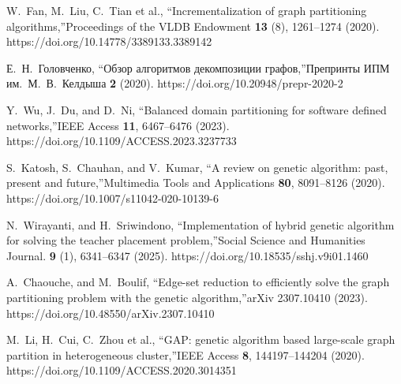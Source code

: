 \documentclass[
11pt,%
tightenlines,%
twoside,%
onecolumn,%
nofloats,%
nobibnotes,%
nofootinbib,%
superscriptaddress,%
noshowpacs,%
centertags]%
{revtex4}
\begin{document}
\begin{thebibliography}{99}
W.~Fan, M.~Liu, C.~Tian et al., \textquotedblleft Incrementalization of graph partitioning algorithms,\textquotedblright Proceedings of the VLDB Endowment \textbf{13} (8), 1261--1274 (2020). https://doi.org/10.14778/3389133.3389142

Е.~Н.~Головченко, \textquotedblleft Обзор алгоритмов декомпозиции графов,\textquotedblright Препринты ИПМ им.~М.~В.~Келдыша \textbf{2} (2020). https://doi.org/10.20948/prepr-2020-2

Y.~Wu, J.~Du, and D.~Ni, \textquotedblleft Balanced domain partitioning for software defined networks,\textquotedblright IEEE Access \textbf{11}, 6467--6476 (2023). https://doi.org/10.1109/ACCESS.2023.3237733

S.~Katosh, S.~Chauhan, and V.~Kumar, \textquotedblleft A review on genetic algorithm: past, present and future,\textquotedblright Multimedia Tools and Applications \textbf{80}, 8091--8126 (2020). https://doi.org/10.1007/s11042-020-10139-6

N.~Wirayanti, and H.~Sriwindono, \textquotedblleft Implementation of hybrid genetic algorithm for solving the teacher placement problem,\textquotedblright Social Science and Humanities Journal. \textbf{9} (1), 6341--6347 (2025). https://doi.org/10.18535/sshj.v9i01.1460

A.~Chaouche, and M.~Boulif, \textquotedblleft Edge-set reduction to efficiently solve the graph partitioning problem with the genetic algorithm,\textquotedblright arXiv 2307.10410 (2023). https://doi.org/10.48550/arXiv.2307.10410

M.~Li, H.~Cui, C.~Zhou et al., \textquotedblleft GAP: genetic algorithm based large-scale graph partition in heterogeneous cluster,\textquotedblright IEEE Access \textbf{8}, 144197--144204 (2020). https://doi.org/10.1109/ACCESS.2020.3014351

\end{thebibliography}
\end{document}
